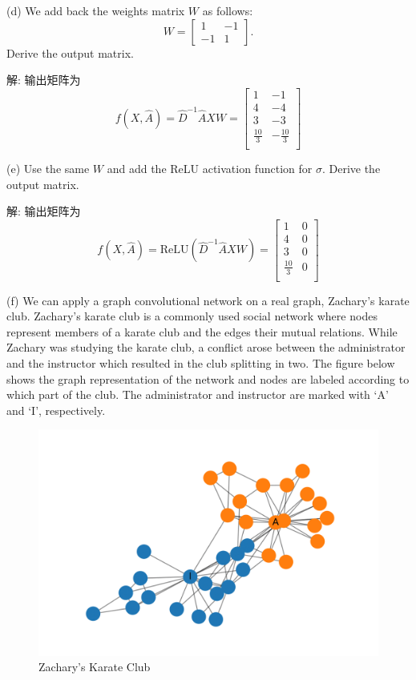 \documentclass{article}
\begin{document}
(d) We add back the weights matrix $W$ as follows: 
$$W =\begin{bmatrix} 1 & -1 \\ -1 & 1 \end{bmatrix}.$$
Derive the output matrix.

解: 输出矩阵为
\begin{equation}
  f(X,\hat{A})=\hat{D}^{-1}\hat{A}XW
  =\begin{bmatrix}
    1 & -1 \\
    4 & -4 \\
    3 & -3 \\
    \frac{10}{3} & -\frac{10}{3} \\
  \end{bmatrix}
\end{equation}

(e) Use the same $W$ and add the ReLU activation function for $\sigma$. Derive the output matrix.

解: 输出矩阵为
\begin{equation}
  f(X,\hat{A})=\mathrm{ReLU}\left(\hat{D}^{-1}\hat{A}XW\right)
  =\begin{bmatrix}
    1 & 0 \\
    4 & 0 \\
    3 & 0 \\
    \frac{10}{3} & 0 \\
  \end{bmatrix}
\end{equation}

(f) We can apply a graph convolutional network on a real graph, Zachary's karate club. Zachary's karate club is a commonly used social network where nodes represent members of a karate club and the edges their mutual relations. While Zachary was studying the karate club, a conflict arose between the administrator and the instructor which resulted in the club splitting in two. The figure below shows the graph representation of the network and nodes are labeled according to which part of the club. The administrator and instructor are marked with `A' and `I', respectively.

\begin{figure}[ht]
  \centering
  \includegraphics[scale=0.22]{club.png}
  \caption{Zachary's Karate Club}
  \label{fig:2_2}
\end{figure}
\end{document}
